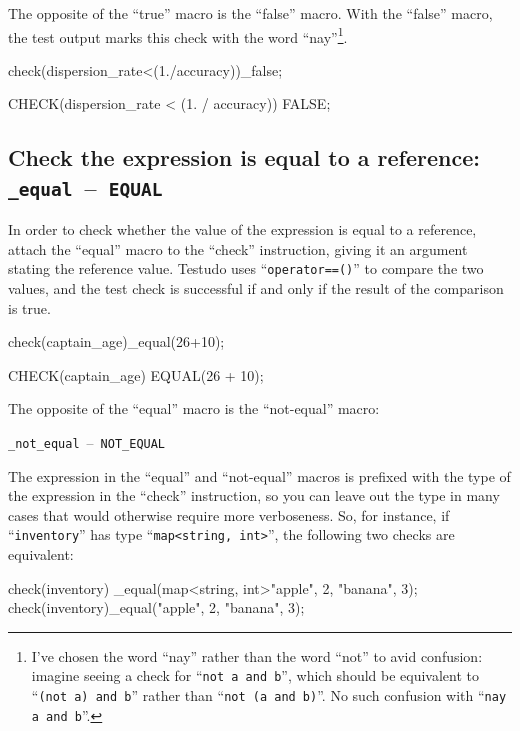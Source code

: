 \documentclass[twoside, a4paper, article]{memoir}
\newcommand*\testudocolor{\color{red!80!blue}}
\newcommand*\testudo[1]{\texttt{\testudocolor{}#1}}
\newcommand*\testudopair[2]{\testudo{#1}~--~\testudo{#2}}
\newcommand\subsectiontestudopair[3]{%
  \subsection[#1]{#1: \testudopair{#2}{#3}}}
\begin{document}
The opposite of the ``true'' macro is the ``false'' macro.  With the ``false''
macro, the test output marks this check with the word ``nay''\footnote{I've
  chosen the word ``nay'' rather than the word ``not'' to avid confusion:
  imagine seeing a check for ``\texttt{not a and b}'', which should be
  equivalent to ``\texttt{(not a) and b}'' rather than ``\texttt{not (a and
    b)}''.  No such confusion with ``\texttt{nay a and b}''.}.

\begin{cpplisting}
check(dispersion_rate<(1./accuracy))_false;
\end{cpplisting}

\begin{cpplisting}
CHECK(dispersion_rate < (1. / accuracy)) FALSE;
\end{cpplisting}

\subsectiontestudopair{Check the expression is equal to a reference}%
  {\_equal}{EQUAL}
\label{sec:check-expression-equal-reference}

In order to check whether the value of the expression is equal to a reference,
attach the ``equal'' macro to the ``check'' instruction, giving it an argument
stating the reference value.  Testudo uses ``\texttt{operator==()}'' to
compare the two values, and the test check is successful if and only if the
result of the comparison is true.

\begin{cpplisting}
check(captain_age)_equal(26+10);
\end{cpplisting}

\begin{cpplisting}
CHECK(captain_age) EQUAL(26 + 10);
\end{cpplisting}

The opposite of the ``equal'' macro is the ``not-equal'' macro:
\begin{center}
  \testudopair{\_not\_equal}{NOT\_EQUAL}
\end{center}

The expression in the ``equal'' and ``not-equal'' macros is prefixed with the
type of the expression in the ``check'' instruction, so you can leave out the
type in many cases that would otherwise require more verboseness.  So, for
instance, if ``\texttt{inventory}'' has type ``\texttt{map<string, int>}'', the
following two checks are equivalent:
\begin{cpplisting}
check(inventory)
  _equal(map<string, int>{{"apple", 2}, {"banana", 3}});
check(inventory)_equal({{"apple", 2}, {"banana", 3}});
\end{cpplisting}
\end{document}

